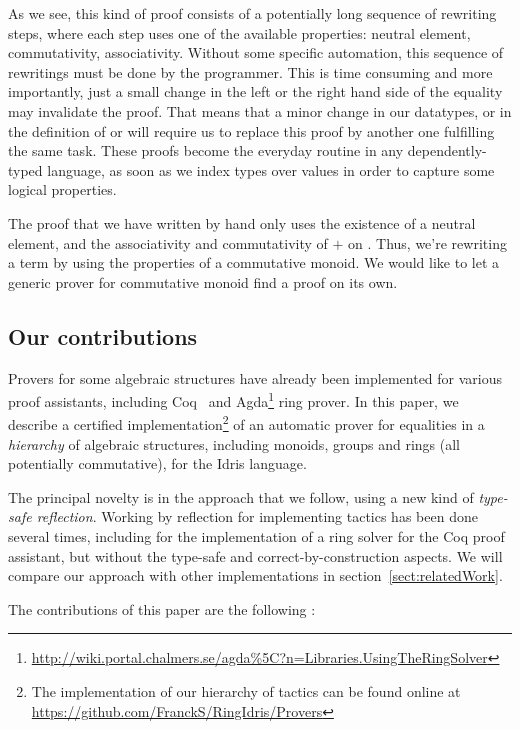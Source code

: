 As we see, this kind of proof consists of a potentially long sequence of rewriting steps, where each step uses one of the available properties: neutral element, commutativity, associativity. Without some specific automation, this sequence of rewritings must be done by the programmer.
This is time consuming and more importantly, just a small change in the left or the right hand side of the equality may invalidate the proof. That means that a minor change in our datatypes, or in the definition of  or  will require us to replace this proof by another one fulfilling the same task.
These proofs become the everyday routine in any dependently-typed language, as soon as we index types over values in order to capture some logical properties.

The proof that we have written by hand only uses the existence of a neutral element, and the associativity and commutativity of $+$ on . Thus, we're rewriting a term by using the properties of a commutative monoid. We would like to let a generic prover for commutative monoid find a proof on its own.

\subsection{Our contributions}

Provers for some algebraic structures have already been implemented for various proof assistants, including Coq~\cite{Coq2005} and Agda\footnote{\url{http://wiki.portal.chalmers.se/agda\%5C?n=Libraries.UsingTheRingSolver}} ring prover. In this paper, we describe a certified
implementation\footnote{The implementation of our hierarchy of tactics can be found online at \url{https://github.com/FranckS/RingIdris/Provers}} of an automatic prover for equalities in a \emph{hierarchy} of algebraic
structures, including monoids, groups and rings (all potentially commutative),
for the Idris language. 

The principal novelty is in the approach that we follow, using a
new kind of \emph{type-safe reflection}.  Working by reflection for implementing tactics has been done several times, including for the implementation of a ring solver for the Coq proof assistant, but without the type-safe and correct-by-construction aspects. We will
compare our approach with other implementations in section~\ref{sect:relatedWork}.

The contributions of this paper are the following :

